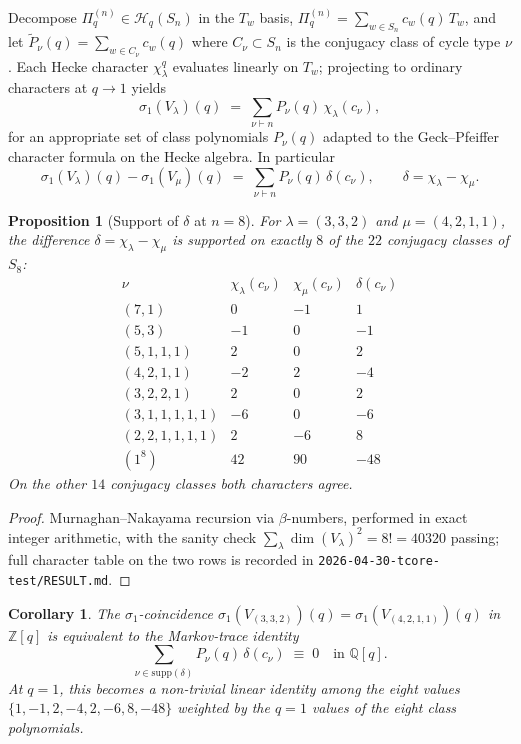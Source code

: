 \documentclass[11pt]{article}
\newtheorem{proposition}[theorem]{Proposition}
\newtheorem{corollary}[theorem]{Corollary}
\theoremstyle{definition}
\theoremstyle{remark}
\newcommand{\bbZ}{\mathbb{Z}}
\newcommand{\bbQ}{\mathbb{Q}}
\newcommand{\Pq}{\Pi_q}
\newcommand{\Hq}{\mathcal{H}_q(S_n)}
\begin{document}
Decompose $\Pq^{(n)} \in \Hq$ in the $T_w$ basis,
$\Pq^{(n)} = \sum_{w \in S_n} c_w(q)\,T_w$, and let
$\widetilde{P}_\nu(q) = \sum_{w \in C_\nu} c_w(q)$
where $C_\nu \subset S_n$ is the conjugacy class of cycle type $\nu$.
Each Hecke character $\chi_\lambda^{q}$ evaluates linearly on $T_w$;
projecting to ordinary characters at $q \to 1$ yields
\[
\sigma_1(V_\lambda)(q) \;=\; \sum_{\nu \vdash n} P_\nu(q)\,\chi_\lambda(c_\nu),
\]
for an appropriate set of class polynomials $P_\nu(q)$ adapted to the
Geck--Pfeiffer character formula on the Hecke algebra.  In particular
\[
\sigma_1(V_\lambda)(q) - \sigma_1(V_\mu)(q)
\;=\; \sum_{\nu \vdash n} P_\nu(q)\,\delta(c_\nu),
\qquad \delta = \chi_\lambda - \chi_\mu.
\]

\begin{proposition}[Support of $\delta$ at $n = 8$]
For $\lambda = (3,3,2)$ and $\mu = (4,2,1,1)$, the difference
$\delta = \chi_\lambda - \chi_\mu$ is supported on exactly $8$ of
the $22$ conjugacy classes of $S_8$:
\[
\begin{array}{lrrr}
\nu & \chi_\lambda(c_\nu) & \chi_\mu(c_\nu) & \delta(c_\nu) \\
\hline
(7,1)             &  0 & -1 &  1 \\
(5,3)             & -1 &  0 & -1 \\
(5,1,1,1)         &  2 &  0 &  2 \\
(4,2,1,1)         & -2 &  2 & -4 \\
(3,2,2,1)         &  2 &  0 &  2 \\
(3,1,1,1,1,1)     & -6 &  0 & -6 \\
(2,2,1,1,1,1)     &  2 & -6 &  8 \\
(1^{8})           & 42 & 90 & -48
\end{array}
\]
On the other $14$ conjugacy classes both characters agree.
\end{proposition}

\begin{proof}
Murnaghan--Nakayama recursion via $\beta$-numbers, performed in
exact integer arithmetic, with the sanity check $\sum_\lambda
\dim(V_\lambda)^{2} = 8! = 40320$ passing; full character table on
the two rows is recorded in
\texttt{2026-04-30-tcore-test/RESULT.md}.
\end{proof}

\begin{corollary}
The $\sigma_1$-coincidence
$\sigma_1(V_{(3,3,2)})(q) = \sigma_1(V_{(4,2,1,1)})(q)$ in $\bbZ[q]$
is equivalent to the Markov-trace identity
\[
\sum_{\nu \in \mathrm{supp}(\delta)} P_\nu(q)\,\delta(c_\nu) \;\equiv\; 0
\quad \text{in } \bbQ[q].
\]
At $q = 1$, this becomes a non-trivial linear identity among the eight
values $\{1, -1, 2, -4, 2, -6, 8, -48\}$ weighted by the $q=1$ values
of the eight class polynomials.
\end{corollary}
\end{document}
